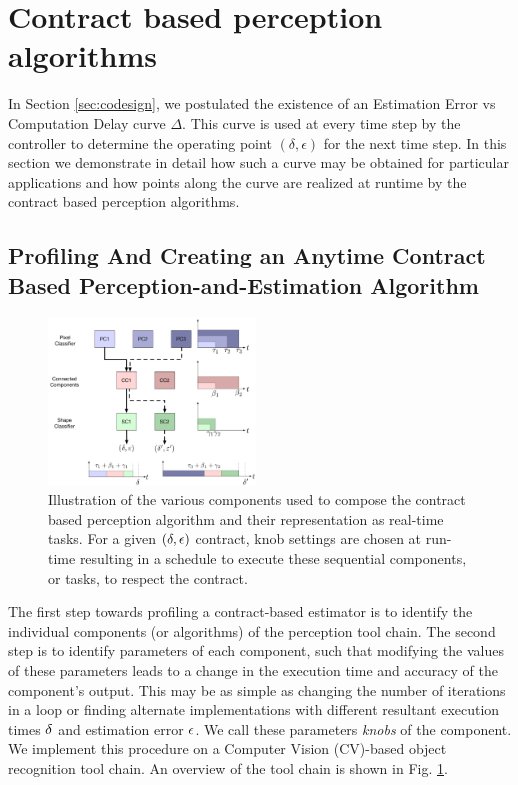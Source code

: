 \section{Contract based perception algorithms}
\label{delayErrorCurve}

In Section \ref{sec:codesign}, we postulated the existence of an Estimation Error vs Computation Delay curve $\Delta$. %
This curve is used at every time step by the controller to determine the operating point $(\delta,\epsilon)$ for the next time step.
In this section we demonstrate in detail how such a curve may be obtained for particular applications and how points along the curve are realized at runtime by the contract based perception algorithms.

\subsection{Profiling And Creating an Anytime Contract Based Perception-and-Estimation Algorithm}
\begin{figure}[htbp]
	\centering
	\includegraphics[width=0.49\textwidth]{figures/omnigraffle_figures/real_time_figure}
	\caption{Illustration of the various components used to compose the contract based perception algorithm and their representation as real-time tasks. For a given $(\delta,\epsilon)$ contract, knob settings are chosen at run-time resulting in a schedule to execute these sequential components, or tasks, to respect the contract.}
	\label{fig:RT_bs}
\end{figure}
The first step towards profiling a contract-based estimator is to identify the individual components (or algorithms) of the perception tool chain. 
The second step is to identify parameters of each component, such that modifying the values of these parameters leads to a change in the execution time and accuracy of the component's output.
This may be as simple as changing the number of iterations in a loop \cite{loop-perf} or finding alternate implementations with different resultant execution times $\delta$ and estimation error $\epsilon$.
We call these parameters \emph{knobs} of the component.
We implement this procedure on a Computer Vision (CV)-based object recognition tool chain. 
An overview of the tool chain is shown in Fig. \ref{fig:RT_bs}.

